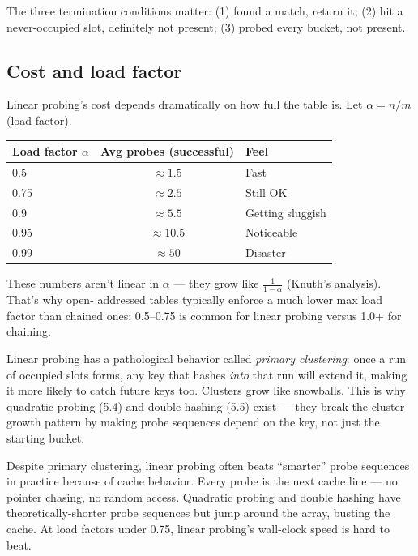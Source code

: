 \documentclass[11pt]{article}
\begin{document}
The three termination conditions matter: (1) found a match,
return it; (2) hit a never-occupied slot, definitely not present;
(3) probed every bucket, not present.

\subsection*{Cost and load factor}

Linear probing's cost depends dramatically on how full the table
is. Let $\alpha = n/m$ (load factor).

\begin{center}
\begin{tabular}{|l|c|l|}
\hline
\textbf{Load factor $\alpha$} & \textbf{Avg probes (successful)} & \textbf{Feel} \\
\hline
0.5  & $\approx 1.5$  & Fast \\
0.75 & $\approx 2.5$  & Still OK \\
0.9  & $\approx 5.5$  & Getting sluggish \\
0.95 & $\approx 10.5$ & Noticeable \\
0.99 & $\approx 50$   & Disaster \\
\hline
\end{tabular}
\end{center}

These numbers aren't linear in $\alpha$ --- they grow like
$\frac{1}{1 - \alpha}$ (Knuth's analysis). That's why open-
addressed tables typically enforce a much lower max load factor
than chained ones: 0.5--0.75 is common for linear probing versus
1.0+ for chaining.

\begin{ideabox}
Linear probing has a pathological behavior called
\emph{primary clustering}: once a run of occupied slots forms,
any key that hashes \emph{into} that run will extend it, making
it more likely to catch future keys too. Clusters grow like
snowballs. This is why quadratic probing (5.4) and double hashing
(5.5) exist --- they break the cluster-growth pattern by making
probe sequences depend on the key, not just the starting bucket.
\end{ideabox}

\begin{notebox}
Despite primary clustering, linear probing often beats ``smarter''
probe sequences in practice because of cache behavior. Every
probe is the next cache line --- no pointer chasing, no random
access. Quadratic probing and double hashing have
theoretically-shorter probe sequences but jump around the array,
busting the cache. At load factors under 0.75, linear probing's
wall-clock speed is hard to beat.
\end{notebox}
\end{document}
